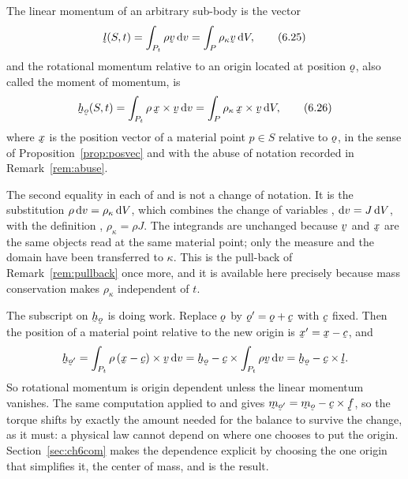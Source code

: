 The linear momentum of an arbitrary sub-body is the vector
\begin{equation}
   \vek{l}(S,t)=\int_{P_{t}}\rho\bv\,\dl v
   =\int_{P}\rho_{\kappa}\bv\,\dl V ,
   \tag{6.25}\label{eq:6.25}
\end{equation}
and the rotational momentum relative to an origin located at position
$\bo$, also called the moment of momentum, is
\begin{equation}
   \bh_{\bo}(S,t)=\int_{P_{t}}\rho\,\bx\times\bv\,\dl v
   =\int_{P}\rho_{\kappa}\,\bx\times\bv\,\dl V ,
   \tag{6.26}\label{eq:6.26}
\end{equation}
where $\bx$ is the position vector of a material point $p\in S$
relative to $\bo$, in the sense of Proposition~\ref{prop:posvec} and
with the abuse of notation recorded in Remark~\ref{rem:abuse}.

The second equality in each of  and  is not a
change of notation. It is the substitution $\rho\,\mathrm{d} v=
\rho_{\kappa}\,\mathrm{d} V$, which combines the change of variables
, $\mathrm{d} v=J\,\mathrm{d} V$, with the definition ,
$\rho_{\kappa}=\rho J$. The integrands are unchanged because $\bv$ and
$\bx$ are the same objects read at the same material point; only the
measure and the domain have been transferred to $\kappa$. This is the
pull-back of Remark~\ref{rem:pullback} once more, and it is available
here precisely because mass conservation makes $\rho_{\kappa}$
independent of $t$.

\begin{remark}\label{rem:ch6origin}
The subscript on $\bh_{\bo}$ is doing work. Replace $\bo$ by
$\bo'=\bo+\bc$ with $\bc$ fixed. Then the position of a material point
relative to the new origin is $\bx'=\bx-\bc$, and
\[
   \bh_{\bo'}=\int_{P_{t}}\rho\,(\bx-\bc)\times\bv\,\dl v
   =\bh_{\bo}-\bc\times\int_{P_{t}}\rho\bv\,\dl v
   =\bh_{\bo}-\bc\times\vek{l} .
\]
So rotational momentum is origin dependent unless the linear momentum
vanishes. The same computation applied to  and 
gives $\bm_{\bo'}=\bm_{\bo}-\bc\times\vek{f}$, so the torque shifts by
exactly the amount needed for the balance  to survive the
change, as it must: a physical law cannot depend on where one chooses
to put the origin. Section~\ref{sec:ch6com} makes the dependence
explicit by choosing the one origin that simplifies it, the center of
mass, and  is the result.
\end{remark}

